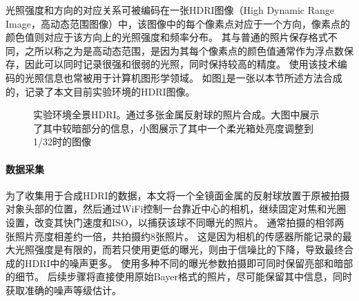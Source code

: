 光照强度和方向的对应关系可被编码在一张HDRI图像（High Dynamic Range Image，高动态范围图像）中，该图像中的每个像素点对应于一个方向，像素点的颜色值则对应于该方向上的光照强度和频率分布。
其与普通的照片保存格式不同，之所以称之为是高动态范围，是因为其每个像素点的颜色值通常作为浮点数保存，因此可以同时记录很强和很弱的光照，同时保持较高的精度。
使用该技术编码的光照信息也常被用于计算机图形学领域。
如图\ref{fig:HDRI}是一张以本节所述方法合成的，记录了本文目前实验环境的HDRI图像。
\begin{figure}
\caption[实验环境全景HDRI]{实验环境全景HDRI。通过多张金属反射球的照片合成。大图中展示了其中较暗部分的信息，小图展示了其中一个柔光箱处亮度调整到1/32时的图像}
\label{fig:HDRI}
\end{figure}

\paragraph{数据采集}
为了收集用于合成HDRI的数据，本文将一个全镜面金属的反射球放置于原被拍摄对象头部的位置，然后通过WiFi控制一台靠近中心的相机，继续固定对焦和光圈设置，改变其快门速度和ISO，以捕获该球不同曝光的照片。
通常拍摄的相邻两张照片亮度相差约一倍，共拍摄约8张照片。
这是因为相机的传感器所能记录的最大光照强度是有限的，而若只使用更低的曝光，则由于信噪比的下降，导致最终合成的HDRI中的噪声更多。
使用多种不同的曝光参数拍摄即可同时保留亮部和暗部的细节。
后续步骤将直接使用原始Bayer格式的照片，尽可能保留其中信息，同时获取准确的噪声等级估计。

